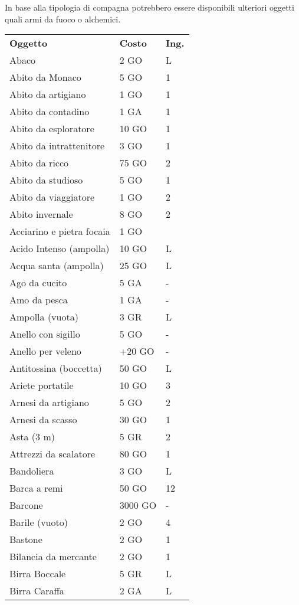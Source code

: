 \documentclass[12pt,a4paper,twoside,openany]{book}
\begin{document}
\begin{multicols}{2}
In base alla tipologia di compagna potrebbero essere disponibili ulteriori oggetti quali armi da fuoco o alchemici.

\medskip

{\small
\begin{tabularx}{0.42\textwidth}{lll}
\textbf{Oggetto}    & \textbf{Costo} & \textbf{Ing.}\\
Abaco&2 GO&L\\
Abito da Monaco & 5 GO& 1\\
Abito da artigiano& 1 GO& 1\\
Abito da contadino& 1 GA& 1\\
Abito da esploratore  & 10 GO& 1\\
Abito da intrattenitore & 3 GO& 1\\
Abito da ricco & 75 GO  & 2\\
Abito da studioso & 5 GO& 1\\
Abito da viaggiatore  & 1 GO& 2\\
Abito invernale & 8 GO& 2\\
Acciarino e pietra focaia & 1 GO&\\
Acido Intenso (ampolla) & 10 GO  & L \\
Acqua santa (ampolla) & 25 GO& L\\
Ago da cucito & 5 GA &- \\
Amo da pesca  & 1 GA& - \\
Ampolla (vuota)& 3 GR& L \\
Anello con sigillo  & 5 GO& - \\
Anello per veleno & +20 GO&-\\
Antitossina (boccetta)  & 50 GO  & L\\
Ariete portatile  & 10 GO& 3 \\
Arnesi da artigiano& 5 GO& 2\\
Arnesi da scasso  & 30 GO& 1\\
Asta (3 m)  & 5 GR& 2\\
Attrezzi da scalatore & 80 GO& 1\\
Bandoliera & 3 GO & L\\
Barca a remi &  50 GO  & 12\\
Barcone & 3000 GO  & -\\
Barile (vuoto)& 2 GO& 4\\
Bastone & 2 GO& 1\\
Bilancia da mercante  & 2 GO& 1\\
Birra Boccale& 5 GR& L\\
Birra Caraffa& 2 GA& L\\

\end{tabularx}}
\end{multicols}
\end{document}
